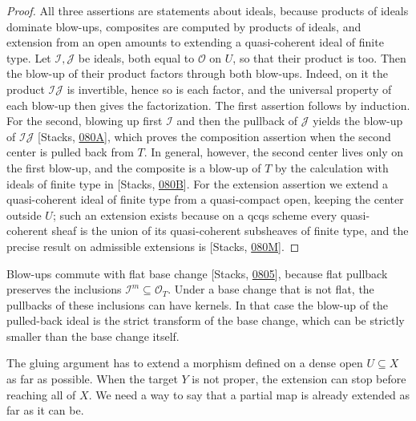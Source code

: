 \documentclass[11pt]{article}
\begin{document}
\begin{proof}[{Proof}]\label{bp34}%
All three assertions are statements about ideals, because products of ideals dominate blow-ups, composites are computed by products of ideals, and extension from an open amounts to extending a quasi-coherent ideal of finite type. Let \(\mathcal I,\mathcal J\) be ideals, both equal to \(\mathcal O\) on \(U\), so that their product is too. Then the blow-up of their product factors through both blow-ups. Indeed, on it the product \(\mathcal I\mathcal J\) is invertible, hence so is each factor, and the universal property of each blow-up then gives the factorization. The first assertion follows by induction. For the second, blowing up first \(\mathcal I\) and then the pullback of \(\mathcal J\) yields the blow-up of \(\mathcal I\mathcal J\) [Stacks, \href{https://stacks.math.columbia.edu/tag/080A}{080A}], which proves the composition assertion when the second center is pulled back from \(T\). In general, however, the second center lives only on the first blow-up, and the composite is a blow-up of \(T\) by the calculation with ideals of finite type in [Stacks, \href{https://stacks.math.columbia.edu/tag/080B}{080B}]. For the extension assertion we extend a quasi-coherent ideal of finite type from a quasi-compact open, keeping the center outside \(U\); such an extension exists because on a qcqs scheme every quasi-coherent sheaf is the union of its quasi-coherent subsheaves of finite type, and the precise result on admissible extensions is [Stacks, \href{https://stacks.math.columbia.edu/tag/080M}{080M}].
\end{proof}

\label{bp35}%
Blow-ups commute with flat base change [Stacks, \href{https://stacks.math.columbia.edu/tag/0805}{0805}], because flat pullback preserves the inclusions \(\mathcal I^m\subseteq\mathcal O_T\). Under a base change that is not flat, the pullbacks of these inclusions can have kernels. In that case the blow-up of the pulled-back ideal is the strict transform of the base change, which can be strictly smaller than the base change itself.

The gluing argument has to extend a morphism defined on a dense open \(U\subseteq X\) as far as possible. When the target \(Y\) is not proper, the extension can stop before reaching all of \(X\). We need a way to say that a partial map is already extended as far as it can be.
\end{document}
